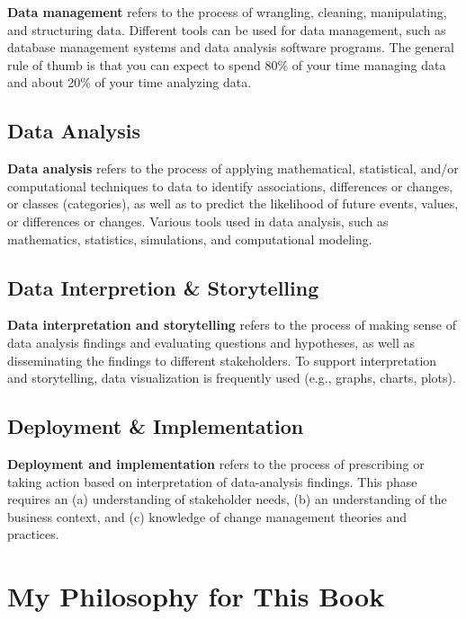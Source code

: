 \documentclass[]{book}
\begin{document}
\textbf{Data management} refers to the process of wrangling, cleaning,
manipulating, and structuring data. Different tools can be used for data
management, such as database management systems and data analysis
software programs. The general rule of thumb is that you can expect to
spend 80\% of your time managing data and about 20\% of your time
analyzing data.

\hypertarget{danalysis}{\subsection{Data Analysis}\label{danalysis}}

\textbf{Data analysis} refers to the process of applying mathematical,
statistical, and/or computational techniques to data to identify
associations, differences or changes, or classes (categories), as well
as to predict the likelihood of future events, values, or differences or
changes. Various tools used in data analysis, such as mathematics,
statistics, simulations, and computational modeling.

\hypertarget{dinterpret}{\subsection{Data Interpretion \&
Storytelling}\label{dinterpret}}

\textbf{Data interpretation and storytelling} refers to the process of
making sense of data analysis findings and evaluating questions and
hypotheses, as well as disseminating the findings to different
stakeholders. To support interpretation and storytelling, data
visualization is frequently used (e.g., graphs, charts, plots).

\subsection{Deployment \& Implementation}\label{ddeploy}

\textbf{Deployment and implementation} refers to the process of
prescribing or taking action based on interpretation of data-analysis
findings. This phase requires an (a) understanding of stakeholder needs,
(b) an understanding of the business context, and (c) knowledge of
change management theories and practices.

\section{My Philosophy for This Book}\label{philosophy}
\end{document}
